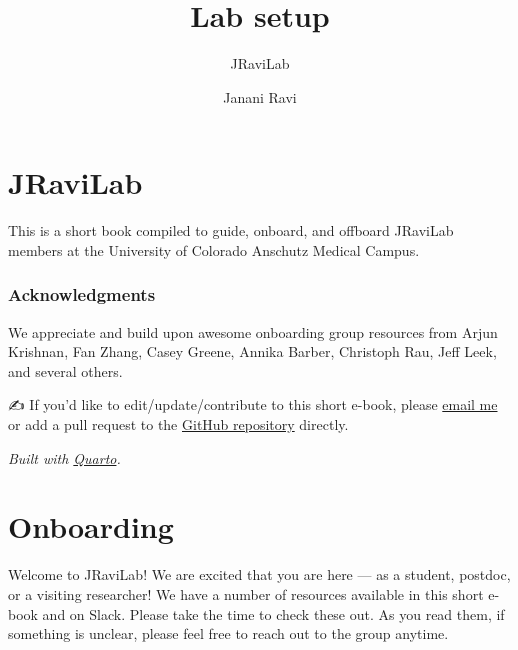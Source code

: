 \documentclass[
  letterpaper,
  DIV=11,
  numbers=noendperiod]{scrreprt}
\title{Lab setup}
\subtitle{JRaviLab}
\author{Janani Ravi}
\date{}
\renewcommand*\contentsname{Table of contents}
\newcommand\contentsname{Table of contents}
\begin{document}
\maketitle
\ifdefined\Shaded\renewenvironment{Shaded}{\begin{tcolorbox}[sharp corners, breakable, interior hidden, borderline west={3pt}{0pt}{shadecolor}, enhanced, boxrule=0pt, frame hidden]}{\end{tcolorbox}}\fi

\renewcommand*\contentsname{Table of contents}
{
\hypersetup{linkcolor=}
\setcounter{tocdepth}{2}
\tableofcontents
}

\hypertarget{jravilab}{%
\chapter*{JRaviLab}\label{jravilab}}

This is a short book compiled to guide, onboard, and offboard JRaviLab
members at the University of Colorado Anschutz Medical Campus.

\hypertarget{acknowledgments}{%
\subsection*{Acknowledgments}\label{acknowledgments}}

We appreciate and build upon awesome onboarding group resources from
Arjun Krishnan, Fan Zhang, Casey Greene, Annika Barber, Christoph Rau,
Jeff Leek, and several others.

✍️ If you'd like to edit/update/contribute to this short e-book, please
\href{mailto:janani.ravi@cuanschutz.edu}{email me} or add a pull request
to the \href{https://github.com/JRaviLab/lab_setup}{GitHub repository}
directly.

\emph{Built with \href{https://quarto.org/docs/books}{Quarto}.}


\hypertarget{onboarding}{%
\chapter{Onboarding}\label{onboarding}}

Welcome to JRaviLab! We are excited that you are here --- as a student,
postdoc, or a visiting researcher! We have a number of resources
available in this short e-book and on Slack. Please take the time to
check these out. As you read them, if something is unclear, please feel
free to reach out to the group anytime.
\end{document}
